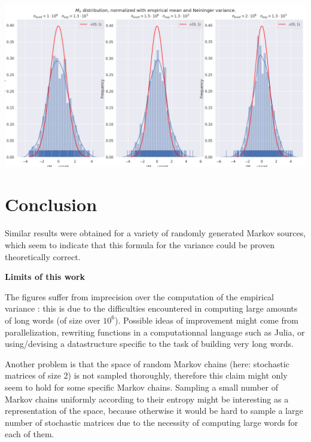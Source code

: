 \noindent
 	 \begin{minipage}{\textwidth}
        \includegraphics[width = \textwidth,
        				    trim = 0 0.5cm 0 0,
        				    	clip=true]{./figs/eig_fig3.png}	
	\end{minipage} 


\section{Conclusion}
Similar results were obtained for a variety of randomly generated Markov sources,
which seem to indicate that this formula for the variance could be proven theoretically
correct. 

\begin{remarque}
\noindent \textbf{Limits of this work}


The figures suffer from imprecision over the computation of the empirical 
variance : this is due to the difficulties encountered in computing large amounts
of long words (of size over $10^6$). Possible ideas of improvement might come from parallelization,
rewriting functions in a computationnal language such as Julia, or using/devising a datastructure
specific to the task of building very long words.

Another problem is that the space of random Markov chains (here: stochastic matrices
of size 2) is not sampled thoroughly, therefore this claim might only seem to hold for some
specific Markov chains. Sampling a small number of Markov chains uniformly
according to their entropy might be interesting as a representation of the space,
 because otherwise it would be hard to sample a large number of stochastic matrices
due to the necessity of computing large words for each of them.

\end{remarque}


